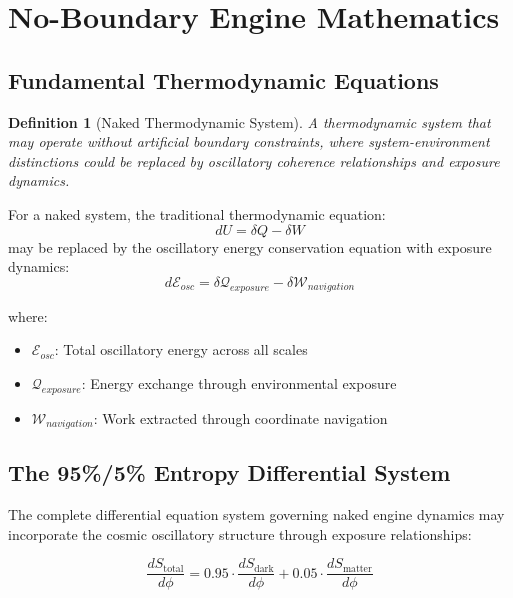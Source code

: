 \documentclass[11pt,a4paper]{article}
\newtheorem{definition}[theorem]{Definition}
\theoremstyle{remark}
\begin{document}
\section{No-Boundary Engine Mathematics}

\subsection{Fundamental Thermodynamic Equations}

\begin{definition}[Naked Thermodynamic System]
A thermodynamic system that may operate without artificial boundary constraints, where system-environment distinctions could be replaced by oscillatory coherence relationships and exposure dynamics.
\end{definition}

For a naked system, the traditional thermodynamic equation:
\begin{equation}
dU = \delta Q - \delta W
\end{equation}
may be replaced by the oscillatory energy conservation equation with exposure dynamics:
\begin{equation}
d\mathcal{E}_{osc} = \delta \mathcal{Q}_{exposure} - \delta \mathcal{W}_{navigation}
\label{eq:naked_energy}
\end{equation}

where:
\begin{itemize}
\item $\mathcal{E}_{osc}$: Total oscillatory energy across all scales
\item $\mathcal{Q}_{exposure}$: Energy exchange through environmental exposure
\item $\mathcal{W}_{navigation}$: Work extracted through coordinate navigation
\end{itemize}

\subsection{The 95\%/5\% Entropy Differential System}

The complete differential equation system governing naked engine dynamics may incorporate the cosmic oscillatory structure through exposure relationships:

\begin{equation}
\frac{dS_{\text{total}}}{d\phi} = 0.95 \cdot \frac{dS_{\text{dark}}}{d\phi} + 0.05 \cdot \frac{dS_{\text{matter}}}{d\phi}
\label{eq:cosmic_entropy}
\end{equation}
\end{document}
